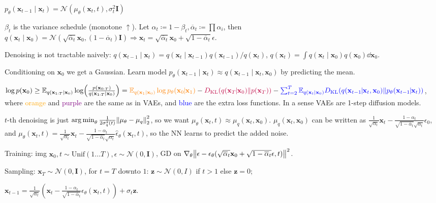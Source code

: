 \documentclass[11pt,landscape,a4paper,fleqn]{article}
\newcommand{\kl}[2]{D_{\mathrm{KL}}(#1\lVert#2)}
\newcommand{\E}{\mathbb{E}}
\DeclareMathOperator*{\argmin}{arg\,min}
\def\myvector#1{\mathbf{#1}}
\def\vx{{\myvector{x}}}
\def\vz{{\myvector{z}}}
\def\mymatrix#1{\mathbf{#1}}
\def\mI{{\mymatrix{I}}}
\begin{document}
\begin{multicols*}{4}
$p_\theta(\vx_{t-1} \mid \vx_t) = \mathcal{N}(\mu_\theta(\vx_t, t), \sigma_t^2 \mI)$

$\beta_t$ is the variance schedule (monotone $\uparrow$).
Let $\alpha_t \coloneqq 1 - \beta_t, \overline{\alpha}_t \coloneqq \prod \alpha_i$,
then $q(\vx_t \mid \vx_0) = \mathcal{N}(\sqrt{\overline{\alpha}_t} \vx_0, (1 - \overline{\alpha}_t)\mI)
\Rightarrow \vx_t = \sqrt{\overline{\alpha}_t} \vx_0 + \sqrt{1 - \overline{\alpha}_t}\epsilon$.

Denoising is not tractable naively:
$q(\vx_{t-1} \mid \vx_t) = q(\vx_t \mid \vx_{t-1}) q(\vx_{t-1}) / q(\vx_t)$,
$q(\vx_t) = \int q(\vx_t \mid \vx_0) q(\vx_0) \dd \vx_0$.

Conditioning on $\vx_0$ we get a Gaussian.
Learn model $p_\theta(\vx_{t-1} \mid \vx_t) \approx q(\vx_{t-1} \mid \vx_t, \vx_0)$
by predicting the mean.

$\log p(\vx_0) \geq \E_{q(\vx_{1:T} \mid \vx_0)} \log(\frac{p(\vx_{0:T})}{q(\vx_{1:T} \mid \vx_0)}) =
\textcolor{orange}{\E_{q(\vx_1 \mid \vx_0)}\log p_\theta(\vx_0 \!\!\mid\!\! \vx_1)} -
\textcolor{purple}{\kl{q(\vx_T \!\!\mid\!\! \vx_0)}{p(\vx_T)}} -
\textcolor{blue}{\sum_{t = 2}^T \E_{q(\vx_t \mid \vx_0)} \kl{q(\vx_{t-1} \!\!\mid\!\! \vx_t, \vx_0)}{p_\theta(\vx_{t-1} \!\!\mid\!\! \vx_t)}}$,
where \textcolor{orange}{orange} and \textcolor{purple}{purple} are the same as in VAEs,
and \textcolor{blue}{blue} are the extra loss functions.
In a sense VAEs are 1-step diffusion models.

$t$-th denoising is just $\argmin_\theta \frac{1}{2 \sigma_q^2(t)} \norm{\mu_\theta - \mu_q}_2^2$,
so we want $\mu_\theta(\vx_t, t) \approx \mu_q(\vx_t, \vx_0)$.
$\mu_q(\vx_t, \vx_0)$ can be written as
$\frac{1}{\sqrt{\alpha_t}} \vx_t - \frac{1 - \alpha_t}{\sqrt{1 - \overline{\alpha}_t} \sqrt{\alpha_t}} \epsilon_0$,
and $\mu_\theta(\vx_t, t) = \frac{1}{\sqrt{\alpha_t}} \vx_t - \frac{1 - \alpha_t}{\sqrt{1 - \overline{\alpha}_t} \sqrt{\alpha_t}} \hat{\epsilon}_\theta(\vx_t, t)$,
so the NN learns to predict the added noise.

Training: img $\vx_0, t \sim \mathrm{Unif}(1... T), \epsilon \sim \mathcal{N}(0, \mI)$,
GD on $\nabla_\theta\norm{\epsilon - \epsilon_\theta(\sqrt{\overline{\alpha}_t}\vx_0 + \sqrt{1 - \overline{\alpha}_t}\epsilon, t)}^2$.

Sampling: $\vx_T \sim \mathcal{N}(0, \mI)$, for $t = T$ downto $1$:
$\vz \sim \mathcal{N}(0, I)$ if $t > 1$ else $\vz = 0$;

$\vx_{t-1} = \frac{1}{\sqrt{\alpha_t}}(\vx_t - \frac{1 - \alpha_t}{\sqrt{1 - \overline{\alpha}_t}} \epsilon_\theta(\vx_t, t)) + \sigma_t \vz$.


\end{multicols*}
\end{document}
